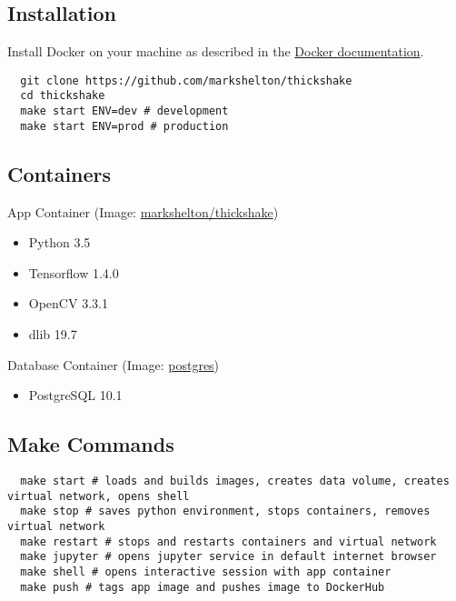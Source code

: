 \subsection{Installation}

Install Docker on your machine as described in the \href{http://docs.docker.com/engine/installation/}{Docker documentation}.

\begin{verbatim}
  git clone https://github.com/markshelton/thickshake
  cd thickshake
  make start ENV=dev # development
  make start ENV=prod # production
\end{verbatim}

\subsection{Containers}

\begin{description}
    \item[App Container (Image: \href{https://hub.docker.com/r/markshelton/thickshake/}{markshelton/thickshake})]
\end{description}

\begin{itemize}
  \item Python 3.5
  \item Tensorflow 1.4.0
  \item OpenCV 3.3.1
  \item dlib 19.7
\end{itemize}

\begin{description}
    \item[Database Container (Image: \href{https://hub.docker.com/_/postgres/}{postgres})]
\end{description}

\begin{itemize}
  \item PostgreSQL 10.1
\end{itemize}

\subsection{Make Commands}

\begin{verbatim}
  make start # loads and builds images, creates data volume, creates virtual network, opens shell
  make stop # saves python environment, stops containers, removes virtual network
  make restart # stops and restarts containers and virtual network
  make jupyter # opens jupyter service in default internet browser
  make shell # opens interactive session with app container
  make push # tags app image and pushes image to DockerHub
\end{verbatim}